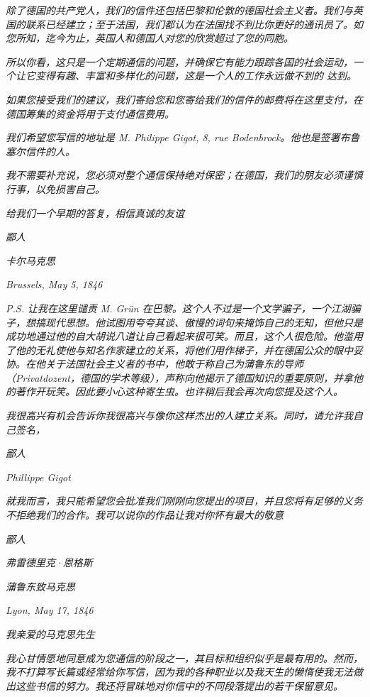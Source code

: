 \documentclass[DIV=12,%
               BCOR=0mm,%
               headinclude=false,%
               footinclude=false,open=any,%
               fontsize=10pt,%
               oneside,%
               paper=210mm:11in]%
               {scrbook}
\begin{document}
\emph{除了德国的共产党人，我们的信件还包括巴黎和伦敦的德国社会主义者。我们与英国的联系已经建立；至于法国，我们都认为在法国找不到比你更好的通讯员了。如您所知，迄今为止，英国人和德国人对您的欣赏超过了您的同胞。}


\emph{所以你看，这只是一个定期通信的问题，并确保它有能力跟踪各国的社会运动，一个让它变得有趣、丰富和多样化的问题，这是一个人的工作永远做不到的 达到。}


\emph{如果您接受我们的建议，我们寄给您和您寄给我们的信件的邮费将在这里支付，在德国筹集的资金将用于支付通信费用。}


\emph{我们希望您写信的地址是 M. Philippe Gigot, 8, rue Bodenbrock。他也是签署布鲁塞尔信件的人。}


\emph{我不需要补充说，您必须对整个通信保持绝对保密；在德国，我们的朋友必须谨慎行事，以免损害自己。}


\emph{给我们一个早期的答复，相信真诚的友谊}


\emph{鄙人}


\emph{卡尔马克思}


\emph{Brussels, May 5, 1846}


\emph{P.S.} \emph{让我在这里谴责 M. Grün 在巴黎。这个人不过是一个文学骗子，一个江湖骗子，想搞现代思想。他试图用夸夸其谈、傲慢的词句来掩饰自己的无知，但他只是成功地通过他的自大胡说八道让自己看起来很可笑。而且，这个人很危险。他滥用了他的无礼使他与知名作家建立的关系，将他们用作梯子，并在德国公众的眼中妥协。在他关于法国社会主义者的书中，他敢于称自己为蒲鲁东的导师（Privatdozent，德国的学术等级），声称向他揭示了德国知识的重要原则，并拿他的著作开玩笑。因此要小心这种寄生虫。也许稍后我会再次向您提及这个人。}


\emph{我很高兴有机会告诉你我很高兴与像你这样杰出的人建立关系。同时，请允许我自己签名，}


\emph{鄙人}


\emph{Phillippe Gigot}


\emph{就我而言，我只能希望您会批准我们刚刚向您提出的项目，并且您将有足够的义务不拒绝我们的合作。我可以说你的作品让我对你怀有最大的敬意}


\emph{鄙人}


\emph{弗雷德里克·恩格斯}


\emph{蒲鲁东致马克思}


\emph{Lyon, May 17, 1846}


\emph{我亲爱的马克思先生}


\emph{我心甘情愿地同意成为您通信的阶段之一，其目标和组织似乎是最有用的。然而，我不打算写长篇或经常给你写信，因为我的各种职业以及我天生的懒惰使我无法做出这些书信的努力。我还将冒昧地对你信中的不同段落提出的若干保留意见。}
\end{document}
